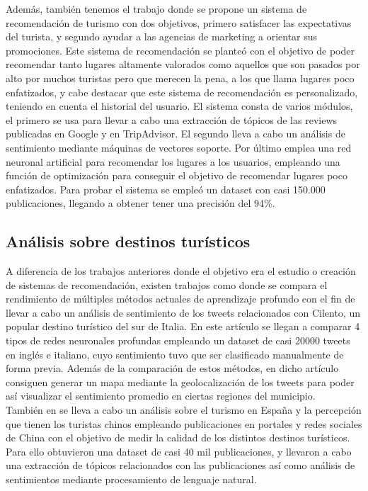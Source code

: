 Además, también tenemos el trabajo \cite{recom_mech_under_emph} donde se propone un sistema de recomendación de turismo con dos objetivos, primero satisfacer las expectativas del turista, y segundo ayudar a las agencias de marketing a orientar sus promociones. Este sistema de recomendación se planteó con el objetivo de poder recomendar tanto lugares altamente valorados como aquellos que son pasados por alto por muchos turistas pero que merecen la pena, a los que llama lugares poco enfatizados, y cabe destacar que este sistema de recomendación es personalizado, teniendo en cuenta el historial del usuario. El sistema consta de varios módulos, el primero se usa para llevar a cabo una extracción de tópicos de las reviews publicadas en Google y en TripAdvisor. El segundo lleva a cabo un análisis de sentimiento mediante máquinas de vectores soporte. Por último emplea una red neuronal artificial para recomendar los lugares a los usuarios, empleando una función de optimización para conseguir el objetivo de recomendar lugares poco enfatizados. Para probar el sistema se empleó un dataset con casi 150.000 publicaciones, llegando a obtener tener una precisión del 94\%.\\

\subsection{Análisis sobre destinos turísticos}

A diferencia de los trabajos anteriores donde el objetivo era el estudio o creación de sistemas de recomendación, existen trabajos como \cite{tourism_dest_rec_geolocation} donde se compara el rendimiento de múltiples métodos actuales de aprendizaje profundo con el fin de llevar a cabo un análisis de sentimiento de los tweets relacionados con Cilento, un popular destino turístico del sur de Italia. En este artículo se llegan a comparar 4 tipos de redes neuronales profundas empleando un dataset de casi 20000 tweets en inglés e italiano, cuyo sentimiento tuvo que ser clasificado manualmente de forma previa. Además de la comparación de estos métodos, en dicho artículo consiguen generar un mapa mediante la geolocalización de los tweets para poder así visualizar el sentimiento promedio en ciertas regiones del municipio.\\

También en \cite{su13116015} se lleva a cabo un análisis sobre el turismo en España y la percepción que tienen los turistas chinos empleando publicaciones en portales y redes sociales de China con el objetivo de medir la calidad de los distintos destinos turísticos. Para ello obtuvieron una dataset de casi 40 mil publicaciones, y llevaron a cabo una extracción de tópicos relacionados con las publicaciones así como análisis de sentimientos mediante procesamiento de lenguaje natural.\\